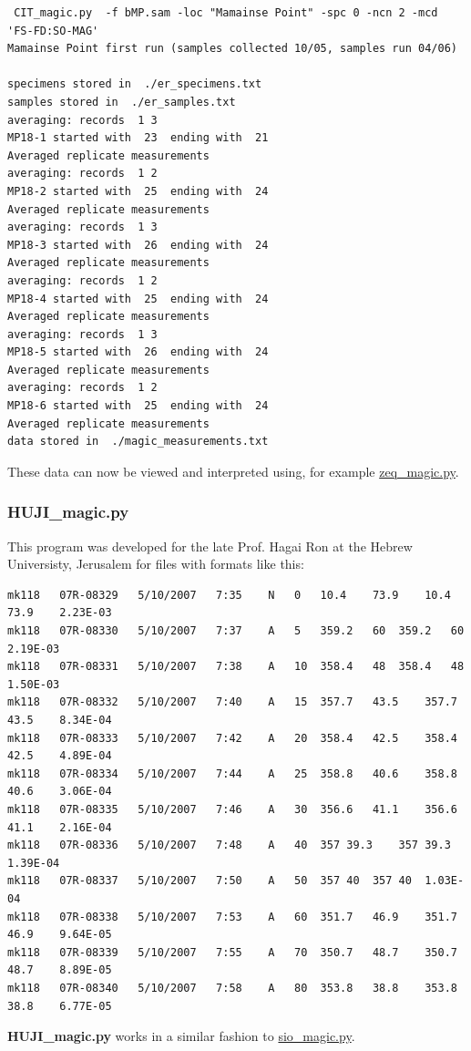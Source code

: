 \documentclass[11pt]{book}
\begin{document}
{{{\begin{verbatim} 
 CIT_magic.py  -f bMP.sam -loc "Mamainse Point" -spc 0 -ncn 2 -mcd 'FS-FD:SO-MAG'
Mamainse Point first run (samples collected 10/05, samples run 04/06)

specimens stored in  ./er_specimens.txt
samples stored in  ./er_samples.txt
averaging: records  1 3
MP18-1 started with  23  ending with  21
Averaged replicate measurements
averaging: records  1 2
MP18-2 started with  25  ending with  24
Averaged replicate measurements
averaging: records  1 3
MP18-3 started with  26  ending with  24
Averaged replicate measurements
averaging: records  1 2
MP18-4 started with  25  ending with  24
Averaged replicate measurements
averaging: records  1 3
MP18-5 started with  26  ending with  24
Averaged replicate measurements
averaging: records  1 2
MP18-6 started with  25  ending with  24
Averaged replicate measurements
data stored in  ./magic_measurements.txt
\end{verbatim}

These data can now be viewed and interpreted using, for example \href{#zeq_magic.py}{zeq\_magic.py}.  

\subsubsection{HUJI\_magic.py}

This program was developed for the late Prof.  Hagai Ron at the Hebrew Universisty, Jerusalem for files with formats like this:


\begin{verbatim}
mk118	07R-08329	5/10/2007	7:35	N	0	10.4	73.9	10.4	73.9	2.23E-03
mk118	07R-08330	5/10/2007	7:37	A	5	359.2	60	359.2	60	2.19E-03
mk118	07R-08331	5/10/2007	7:38	A	10	358.4	48	358.4	48	1.50E-03
mk118	07R-08332	5/10/2007	7:40	A	15	357.7	43.5	357.7	43.5	8.34E-04
mk118	07R-08333	5/10/2007	7:42	A	20	358.4	42.5	358.4	42.5	4.89E-04
mk118	07R-08334	5/10/2007	7:44	A	25	358.8	40.6	358.8	40.6	3.06E-04
mk118	07R-08335	5/10/2007	7:46	A	30	356.6	41.1	356.6	41.1	2.16E-04
mk118	07R-08336	5/10/2007	7:48	A	40	357	39.3	357	39.3	1.39E-04
mk118	07R-08337	5/10/2007	7:50	A	50	357	40	357	40	1.03E-04
mk118	07R-08338	5/10/2007	7:53	A	60	351.7	46.9	351.7	46.9	9.64E-05
mk118	07R-08339	5/10/2007	7:55	A	70	350.7	48.7	350.7	48.7	8.89E-05
mk118	07R-08340	5/10/2007	7:58	A	80	353.8	38.8	353.8	38.8	6.77E-05
\end{verbatim}

   {\bf HUJI\_magic.py}  works in a similar fashion to \href{#sio_magic.py}{sio\_magic.py}.  

}}}
\end{document}
